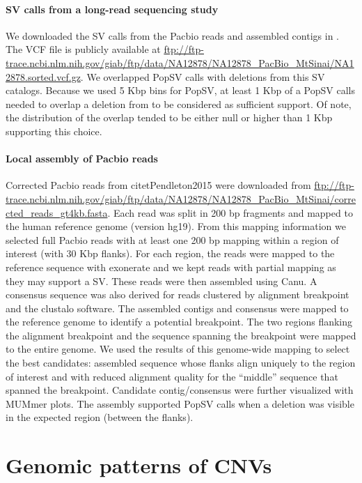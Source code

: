 \paragraph{SV calls from a long-read sequencing study}
We downloaded the SV calls from the Pacbio reads and assembled contigs in \citet{Pendleton2015}.
The VCF file is publicly available at \url{ftp://ftp-trace.ncbi.nlm.nih.gov/giab/ftp/data/NA12878/NA12878_PacBio_MtSinai/NA12878.sorted.vcf.gz}.
We overlapped {\sf PopSV} calls with deletions from this SV catalogs.
Because we used 5 Kbp bins for {\sf PopSV}, at least 1 Kbp of a {\sf PopSV} calls needed to overlap a deletion from \citet{Pendleton2015} to be considered as sufficient support.
Of note, the distribution of the overlap tended to be either null or higher than 1 Kbp supporting this choice.

\paragraph{Local assembly of Pacbio reads}
Corrected Pacbio reads from citet{Pendleton2015} were downloaded from \url{ftp://ftp-trace.ncbi.nlm.nih.gov/giab/ftp/data/NA12878/NA12878_PacBio_MtSinai/corrected_reads_gt4kb.fasta}.
Each read was split in 200 bp fragments and mapped to the human reference genome (version hg19).
From this mapping information we selected full Pacbio reads with at least one 200 bp mapping within a region of interest (with 30 Kbp flanks).
For each region, the reads were mapped to the reference sequence with exonerate and we kept reads with partial mapping as they may support a SV.
These reads were then assembled using {\sf Canu}\cite{Koren2017}.
A consensus sequence was also derived for reads clustered by alignment breakpoint and the {\sf clustalo}\cite{Sievers2011} software.
The assembled contigs and consensus were mapped to the reference genome to identify a potential breakpoint.
The two regions flanking the alignment breakpoint and the sequence spanning the breakpoint were mapped to the entire genome.
We used the results of this genome-wide mapping to select the best candidates: assembled sequence whose flanks align uniquely to the region of interest and with reduced alignment quality for the ``middle'' sequence that spanned the breakpoint.
Candidate contig/consensus were further visualized with MUMmer plots\cite{Kurtz2004}.
The assembly supported {\sf PopSV} calls when a deletion was visible in the expected region (between the flanks).


\section*{Genomic patterns of CNVs}

